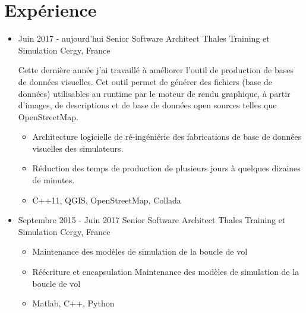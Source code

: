 
\section{Expérience}


\begin{itemize}

\item{
\cventrylc
{Juin 2017 - aujourd'hui} %
{Senior Software Architect} %
{Thales Training et Simulation} %
{Cergy, France} %
{}
{ %
\myvspace
Cette dernière année j'ai travaillé à améliorer l'outil de production de bases de données visuelles. Cet outil permet de générer des fichiers
(base de données) utilisables au runtime par le moteur de rendu graphique, à partir d'images, de descriptions et de base de données open sources
telles que OpenStreetMap.
\myvspace
\begin{itemize}
\item {Architecture logicielle de ré-ingéniérie des fabrications de base de données visuelles des simulateurs.}
\item {Réduction des temps de production de plusieurs jours à quelques dizaines de minutes.}
\item {C++11, QGIS, OpenStreetMap, Collada}
\end{itemize}
}
{
}
}
\item{
\cventrylc
{Septembre 2015 - Juin 2017} %
{Senior Software Architect} %
{Thales Training et Simulation} %
{Cergy, France} %
{}
{ %
\begin{itemize}
\item {Maintenance des modèles de simulation de la boucle de vol}
\item {Réécriture et encapsulation Maintenance des modèles de simulation de la boucle de vol}
\item {Matlab, C++, Python}
\end{itemize}
}
}




\end{itemize}